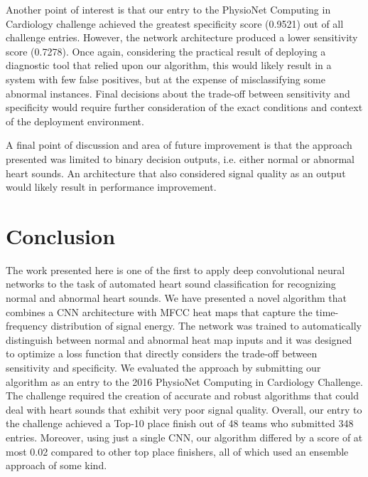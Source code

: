 \documentclass{article}
\begin{document}
Another point of interest is that our entry to the PhysioNet Computing in Cardiology challenge achieved the greatest specificity score (0.9521) out of all challenge entries. However, the network architecture produced a lower sensitivity score (0.7278). Once again, considering the practical result of deploying a diagnostic tool that relied upon our algorithm, this would likely result in a system with few false positives, but at the expense of misclassifying some abnormal instances. Final decisions about the trade-off between sensitivity and specificity would require further consideration of the exact conditions and context of the deployment environment.

A final point of discussion and area of future improvement is that the approach presented was limited to binary decision outputs, i.e. either normal or abnormal heart sounds. An architecture that also considered signal quality as an output would likely result in performance improvement. 

\section{Conclusion}
\label{sec:conclusion}

The work presented here is one of the first to apply deep convolutional neural networks to the task of automated heart sound classification for recognizing normal and abnormal heart sounds.
We have presented a novel algorithm that combines a CNN architecture with MFCC heat maps that capture the time-frequency distribution of signal energy.
The network was trained to automatically distinguish between normal and abnormal heat map inputs and it was designed to optimize a loss function that directly considers the trade-off between sensitivity and specificity.
We evaluated the approach by submitting our algorithm as an entry to the 2016 PhysioNet Computing in Cardiology Challenge.
The challenge required the creation of accurate and robust algorithms that could deal with heart sounds that exhibit very poor signal quality.
Overall, our entry to the challenge achieved a Top-10 place finish out of 48 teams who submitted 348 entries. 
Moreover, using just a single CNN, our algorithm differed by a score of at most 0.02 compared to other top place finishers, all of which used an ensemble approach of some kind.



\end{document}
